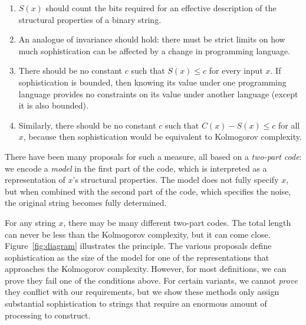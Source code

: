 \documentclass{style/llncs}
\begin{document}
\begin{enumerate}
\item $S(x)$ should count the bits required for an effective description of the structural properties of a binary string.
\item An analogue of invariance should hold: there must be strict limits on how much sophistication can be affected by a change in programming language.
\item There should be no constant $c$ such that $S(x)\le c$ for every input $x$. If sophistication is bounded, then knowing its value under one programming language provides no constraints on its value under another language (except it is also bounded). 
\item Similarly, there should be no constant $c$ such that $C(x)-S(x)\le c$ for all $x$, because then sophistication would be equivalent to Kolmogorov complexity. 
\end{enumerate}
There have been many proposals for such a measure, all based on a \emph{two-part code}: we encode a \emph{model} in the first part of the code, which is interpreted as a representation of $x$'s structural properties. The model does not fully specify $x$, but when combined with the second part of the code, which specifies the noise, the original string becomes fully determined.\footnotemark


For any string $x$, there may be many different two-part codes. The total length can never be less than the Kolmogorov complexity, but it can come close. Figure~\ref{fig:diagram} illustrates the principle. The various proposals define sophistication as the size of the model for one of the representations that approaches the Kolmogorov complexity. However, for most definitions, we can prove  they fail one of the conditions above. For certain variants, we cannot \emph{prove} they conflict with our requirements, but we show these methods only assign substantial sophistication to strings that require an enormous amount of processing to construct. 
\end{document}
